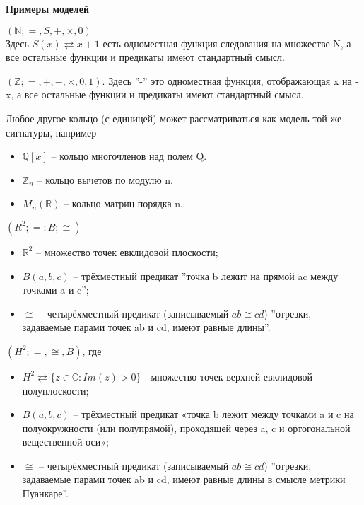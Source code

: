 \begin{center}
	\textbf{Примеры моделей}
\end{center}

\begin{example} 
	$(\mathbb{N}; =, S, +, \times, 0)$ \\
	Здесь $S(x) \rightleftarrows x+1 $ есть одноместная функция следования на множестве N,
	а все остальные функции и предикаты имеют стандартный смысл.
\end{example}

\begin{example} 
	$(\mathbb{Z}; =,+,-,\times,0,1)$. Здесь ''-'' это одноместная функция, отображающая x на -x, а все остальные
	функции и предикаты имеют стандартный смысл.
\end{example}

\begin{example} 
	Любое другое кольцо (с единицей) может рассматриваться как
	модель той же сигнатуры, например
	\begin{itemize}
		\item $\mathbb{Q}[x]$ -- кольцо многочленов над полем Q.
		\item $\mathbb{Z}_{n}$ -- кольцо вычетов по модулю n.
		\item $M_{n}(\mathbb{R})$ -- кольцо матриц порядка n.
	\end{itemize}
\end{example}

\begin{example}  $(R^{2};=;B;\cong)$
	\begin{itemize}
		\item $\mathbb{R}^2$ -- множество точек евклидовой плоскости;
		\item $B(a, b ,c)$ -- трёхместный предикат ''точка b лежит на прямой ac между точками a и c'';
		\item $\cong$ -- четырёхместный предикат (записываемый $ab \cong cd$) ''отрезки, задаваемые парами точек ab и
			cd, имеют равные длины''.
	\end{itemize}
\end{example}

\begin{example} 
	$(H^2; =,\cong, B)$, где
	\begin{itemize}
		\item $H^2 \rightleftarrows \{z \in \mathbb{C} : Im(z)>0 \}$ - множество точек верхней евклидовой полуплоскости;
		\item $B(a, b ,c)$ -- трёхместный предикат «точка b лежит между точками a и c на полуокружности (или полупрямой),
			проходящей через a, c и ортогональной вещественной оси»;
		\item $\cong$ -- четырёхместный предикат (записываемый $ab \cong cd$) ''отрезки, задаваемые парами точек ab и cd,
			имеют равные длины в смысле метрики Пуанкаре''.
	\end{itemize}
\end{example}
